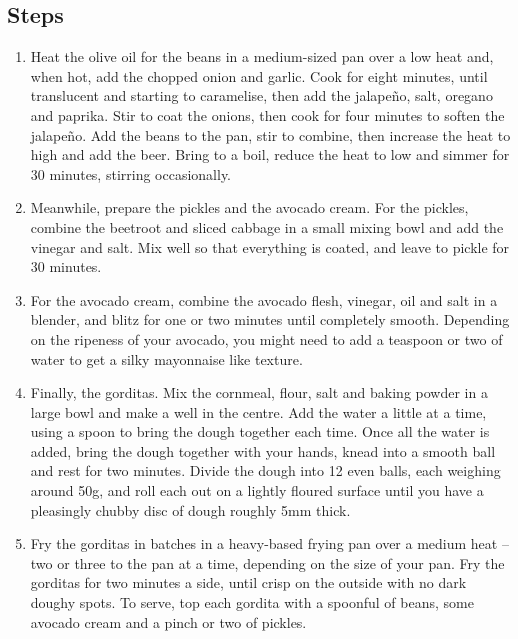 \documentclass{book}
\begin{document}
\subsection*{Steps}
\begin{enumerate}
\item Heat the olive oil for the beans in a medium-sized pan over a low heat and, when hot, add the chopped onion and garlic. Cook for eight minutes, until translucent and starting to caramelise, then add the jalapeño, salt, oregano and paprika. Stir to coat the onions, then cook for four minutes to soften the jalapeño. Add the beans to the pan, stir to combine, then increase the heat to high and add the beer. Bring to a boil, reduce the heat to low and simmer for 30 minutes, stirring occasionally.
\item Meanwhile, prepare the pickles and the avocado cream. For the pickles, combine the beetroot and sliced cabbage in a small mixing bowl and add the vinegar and salt. Mix well so that everything is coated, and leave to pickle for 30 minutes.
\item For the avocado cream, combine the avocado flesh, vinegar, oil and salt in a blender, and blitz for one or two minutes until completely smooth. Depending on the ripeness of your avocado, you might need to add a teaspoon or two of water to get a silky mayonnaise like texture.
\item Finally, the gorditas. Mix the cornmeal, flour, salt and baking powder in a large bowl and make a well in the centre. Add the water a little at a time, using a spoon to bring the dough together each time. Once all the water is added, bring the dough together with your hands, knead into a smooth ball and rest for two minutes. Divide the dough into 12 even balls, each weighing around 50g, and roll each out on a lightly floured surface until you have a pleasingly chubby disc of dough roughly 5mm thick.
\item Fry the gorditas in batches in a heavy-based frying pan over a medium heat – two or three to the pan at a time, depending on the size of your pan. Fry the gorditas for two minutes a side, until crisp on the outside with no dark doughy spots. To serve, top each gordita with a spoonful of beans, some avocado cream and a pinch or two of pickles.
\end{enumerate}
\newpage
\end{document}
